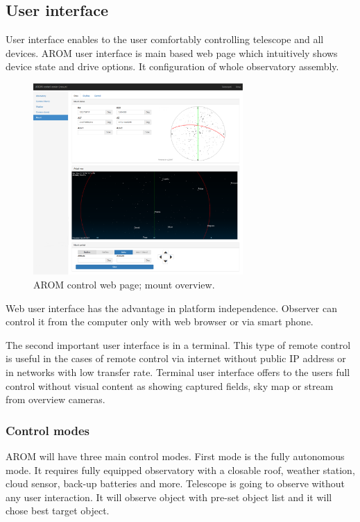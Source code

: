 \documentclass{ibws_template}
\begin{document}
\subsection{User interface}
User interface enables to the user comfortably controlling telescope and all devices. AROM user interface is main based web page which intuitively shows device state and drive options. It configuration of whole observatory assembly.

\begin{figure}[h!]
\begin{center}
\includegraphics[width=80mm]{img/arom_ui.eps}
\caption{AROM control web page; mount overview.} 
\end{center}
\end{figure}
\pagebreak

Web user interface has the advantage in platform independence. Observer can control it from the computer only with web browser or via smart phone. 

The second important user interface is in a terminal. This type of remote control is useful in the cases of remote control via internet without public IP address or in networks with low transfer rate. Terminal user interface offers to the users full control without visual content as showing captured fields, sky map or stream from overview cameras.

\subsubsection{Control modes}
AROM will have three main control modes. First mode is the fully autonomous mode. It requires fully equipped observatory with a closable roof, weather station, cloud sensor, back-up batteries and more. Telescope is going to observe without any user interaction. It will observe object with pre-set object list and it will chose best target object. 
\end{document}
